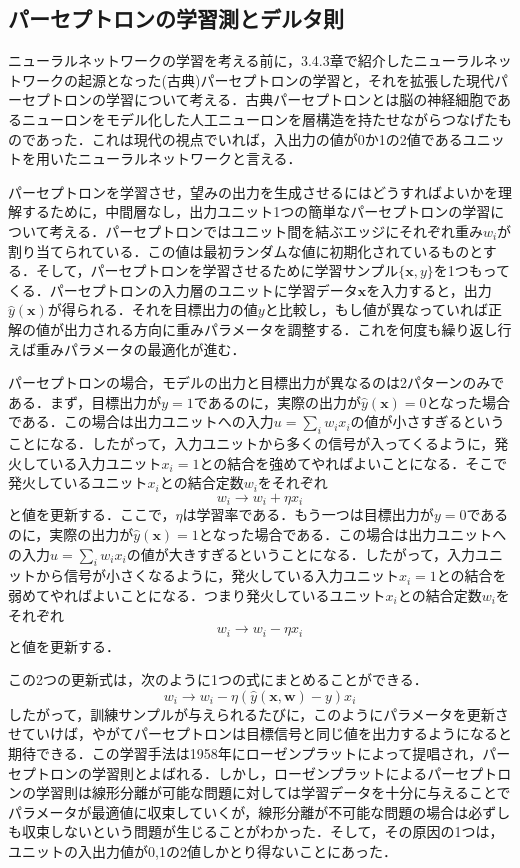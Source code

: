 \documentclass[a4paper,11pt]{jsreport}
\begin{document}
\subsection{パーセプトロンの学習測とデルタ則}
ニューラルネットワークの学習を考える前に，3.4.3章で紹介したニューラルネットワークの起源となった(古典)パーセプトロンの学習と，それを拡張した現代パーセプトロンの学習について考える．古典パーセプトロンとは脳の神経細胞であるニューロンをモデル化した人工ニューロンを層構造を持たせながらつなげたものであった．これは現代の視点でいれば，入出力の値が0か1の2値であるユニットを用いたニューラルネットワークと言える．\par
パーセプトロンを学習させ，望みの出力を生成させるにはどうすればよいかを理解するために，中間層なし，出力ユニット1つの簡単なパーセプトロンの学習について考える．パーセプトロンではユニット間を結ぶエッジにそれぞれ重み$w_i$が割り当てられている．この値は最初ランダムな値に初期化されているものとする．そして，パーセプトロンを学習させるために学習サンプル$\{\bm{x}, y\}$を1つもってくる．パーセプトロンの入力層のユニットに学習データ$\bm{x}$を入力すると，出力$\hat{y}(\bm{x})$が得られる．それを目標出力の値$y$と比較し，もし値が異なっていれば正解の値が出力される方向に重みパラメータを調整する．これを何度も繰り返し行えば重みパラメータの最適化が進む．\par
パーセプトロンの場合，モデルの出力と目標出力が異なるのは2パターンのみである．まず，目標出力が$y=1$であるのに，実際の出力が$\hat{y}(\bm{x})=0$となった場合である．この場合は出力ユニットへの入力$u=\sum_{i}w_i x_i$の値が小さすぎるということになる．したがって，入力ユニットから多くの信号が入ってくるように，発火している入力ユニット$x_i=1$との結合を強めてやればよいことになる．そこで発火しているユニット$x_i$との結合定数$w_i$をそれぞれ
\begin{equation}
  w_i \rightarrow w_i + \eta x_i
\end{equation} 
と値を更新する．ここで，$\eta$は学習率である．もう一つは目標出力が$y=0$であるのに，実際の出力が$\hat{y}(\bm{x})=1$となった場合である．この場合は出力ユニットへの入力$u=\sum_{i}w_i x_i$の値が大きすぎるということになる．したがって，入力ユニットから信号が小さくなるように，発火している入力ユニット$x_i=1$との結合を弱めてやればよいことになる．つまり発火しているユニット$x_i$との結合定数$w_i$をそれぞれ
\begin{equation}
  w_i \rightarrow w_i - \eta x_i
\end{equation} 
と値を更新する．\par
この2つの更新式は，次のように1つの式にまとめることができる．
\begin{equation}
  w_i \rightarrow w_i - \eta (\hat{y}(\bm{x},\bm{w}) - y) x_i
\end{equation}
したがって，訓練サンプルが与えられるたびに，このようにパラメータを更新させていけば，やがてパーセプトロンは目標信号と同じ値を出力するようになると期待できる．この学習手法は1958年にローゼンプラットによって提唱され，パーセプトロンの学習則とよばれる．しかし，ローゼンプラットによるパーセプトロンの学習則は線形分離が可能な問題に対しては学習データを十分に与えることでパラメータが最適値に収束していくが，線形分離が不可能な問題の場合は必ずしも収束しないという問題が生じることがわかった．そして，その原因の1つは，ユニットの入出力値が0,1の2値しかとり得ないことにあった．\par
\end{document}
